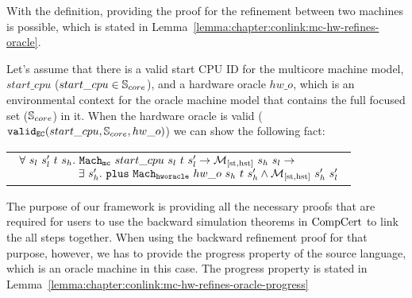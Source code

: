 %
%

With the definition, providing the proof for the refinement between two machines is possible,
which is stated in Lemma~\ref{lemma:chapter:conlink:mc-hw-refines-oracle}.
\begin{lemma}
\label{lemma:chapter:conlink:mc-hw-refines-oracle}
Let's assume that there is a valid start CPU ID for the multicore machine model, 
$start\_cpu$ ($start\_cpu \in {\mathbb{S}_{core}}$), and a hardware oracle $hw\_o$,  
which is an environmental context for the oracle machine model that contains the full focused set (${\mathbb{S}_{core}}$) in it.
When the hardware oracle is valid ($ {{\mathrm{\texttt{valid}}}_{{\mathrm{\texttt{EC}}}}}({start\_cpu}, {{\mathbb{S}_{core}}}, {hw\_o})$) we can show the following fact:
\begin{center}
\begin{tabular}{P{0.95\textwidth}}
$
\begin{array}{l}
\forall \ s_l \ s_l' \ t \ s_h . \ \hardwarestep{start\_cpu}{s_l}{t}{s_l'} \rightarrow  \matchstatehstate{s_h}{s_l} \rightarrow \\
\ \ \ \ \ \ \ \ \ \ \ \ \ \ \ \ \exists\ s_h' . \  \ccplusstep{\oraclestep{hw\_o}{s_h}{t}{s_h'}} \wedge  \matchstatehstate{s_h'}{s_l'}\\
\end{array}
$
\end{tabular}
\end{center}
\end{lemma}

The purpose of our framework is providing all the necessary proofs that are required 
for users to use the backward simulation theorems in $\mathrm{CompCert}$ to link the all steps together. 
When using the backward refinement proof for that purpose, however, we has to provide the progress property of the 
source language, which is an oracle machine in this case. 
The progress property is stated in Lemma~\ref{lemma:chapter:conlink:mc-hw-refines-oracle-progress}

